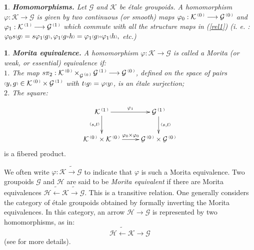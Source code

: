 \documentclass[a4paper]{article}
\newtheorem{num}[st]{}
\newcommand{\f}{\ensuremath{\varphi}}
\newcommand{\rmap}{\longrightarrow}
\newcommand{\lmap}{\longleftarrow}
\newcommand{\Ka}{\ensuremath{\mathcal{K}}}
\newcommand{\Ha}{\ensuremath{\mathcal{H}}}
\newcommand{\G}{\ensuremath{\mathcal{G}}}
\newcommand{\ps}{{\raise 1pt\hbox{\tiny (}}}
\newcommand{\pd}{{\raise 1pt\hbox{\tiny )}}}
\newcommand{\nG}[1]{\ensuremath{\G^{\,\ps #1\,\pd}}}
\newcommand{\nK}[1]{\ensuremath{\Ka^{\,\ps #1\,\pd}}}
\def\compose{{\raise 1pt\hbox{$\scriptscriptstyle\circ$}}}
\begin{document}
\begin{num}
\emph{
{\bf Homomorphisms.} Let $\G$ and $\Ka$ be \'etale groupoids. A {\it homomorphism} $\f : \Ka \rmap \G$ is given by two continuous (or smooth) maps $\f_{0} : \nK{0} \rmap \nG{0}$ and $\f_{1} : \nK{1} \rmap \nG{1}$ which commute with all the structure maps in (\ref{rel1}) (i. e. : $\f_{0} s\ps g\pd= s\f_{1} \ps g\pd, \f_{1} \ps g \compose h\pd= \f_{1} \ps g\pd \compose \f_{1} \ps h\pd ,$ etc.)
}
\end{num}



\begin{num}
\label{morita}
\emph{
{\bf Morita equivalence.} A homomorphism $\f : \Ka \rmap \G$ is called a {\it Morita} (or weak, or essential) {\it equivalence} if:\\  
\hspace*{.3in} $1$. The map $s \pi_{2}: \nK{0} \times_{\nG{0}} \nG{1} \rmap \nG{0}$, defined on the space of pairs $\ps y, g\pd \in \nK{0} \times \nG{1}$ with $t\ps g\pd= \f \ps y\pd$, is an \'etale surjection; \\ 
\hspace*{.3in} $2$. The square:
} 
\end{num}
\[ \xymatrix {
\nK{1} \ar[r]^-{\f_{1}} \ar[d]_-{\ps s, t\pd} & \nG{1} \ar[d]^-{\ps s,t \pd}\\
\nK{0}\times \nK{0} \ar[r]^-{\f_{0} \times \f_{0}} & \nG{0}\times \nG{0} }\]
is a fibered product. \par
We often write $\f: \Ka \tilde{\rmap} \G$ to indicate that $\f$ is such a Morita equivalence. Two groupoids $\G$ and $\Ha$ are said to be {\it Morita equivalent} if there are Morita equivalences $\Ha \tilde{\lmap}   \Ka \tilde{\rmap} \G$. This is a transitive relation. One generally considers the category of \'etale groupoids obtained by formally inverting the Morita equivalences. In this category, an arrow $\Ha \rmap \G$ is represented by two homomorphisms, as in:
\[ \Ha \tilde{\lmap}   \Ka \rmap \G \]
(see \cite{Fourier} for more details). 
\end{document}
